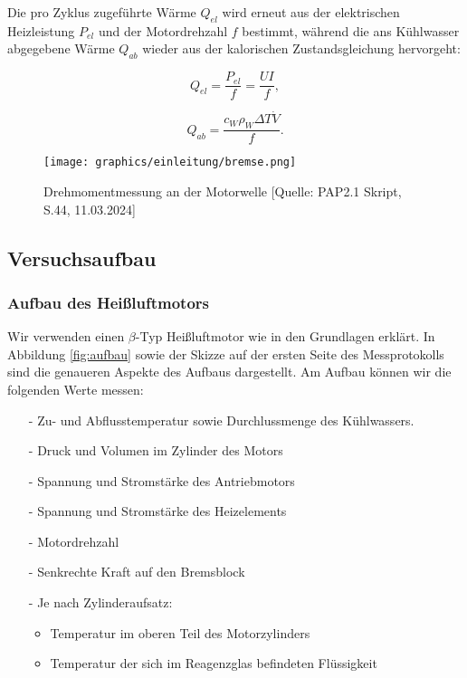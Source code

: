 \documentclass{article}
\begin{document}
Die pro Zyklus zugeführte Wärme $Q_{el}$ wird erneut aus der elektrischen Heizleistung $P_{el}$ und der Motordrehzahl $f$ bestimmt, während die ans Kühlwasser abgegebene Wärme $Q_{ab}$ wieder aus der kalorischen Zustandsgleichung hervorgeht:

\begin{equation}
    Q_{el} = \frac{P_{el}}{f} = \frac{U I}{f},
    \label{eq:Wärmekraftmaschine-Q_el}
\end{equation}

\begin{equation}
    Q_{ab} = \frac{c_W \rho_W \Delta T  \dot{V}}{f}.
    \label{eq:Wärmekraftmaschine-Q_ab}
\end{equation}

\begin{figure}[!b]
    \centering
    \texttt{[image: graphics/einleitung/bremse.png]}
    \caption{Drehmomentmessung an der Motorwelle [Quelle: PAP2.1 Skript, S.44, 11.03.2024]}
    \label{fig:Bremsbalken}
\end{figure}


\clearpage
\newpage
\subsection{Versuchsaufbau}

\subsubsection{Aufbau des Heißluftmotors}

Wir verwenden einen $\beta$-Typ Heißluftmotor wie in den Grundlagen erklärt. In Abbildung \ref{fig:aufbau} sowie der Skizze auf der ersten Seite des Messprotokolls sind die genaueren Aspekte des Aufbaus dargestellt. Am Aufbau können wir die folgenden Werte messen:

\begin{itemize}
    \item[-] Zu- und Abflusstemperatur sowie Durchlussmenge des Kühlwassers.
    \item[-] Druck und Volumen im Zylinder des Motors
    \item[-] Spannung und Stromstärke des Antriebmotors
    \item[-] Spannung und Stromstärke des Heizelements
    \item[-] Motordrehzahl
    \item[-] Senkrechte Kraft auf den Bremsblock
    \item[-] Je nach Zylinderaufsatz:
        \begin{itemize}
            \item Temperatur im oberen Teil des Motorzylinders
            \item Temperatur der sich im Reagenzglas befindeten Flüssigkeit
        \end{itemize}
\end{itemize}
\end{document}
